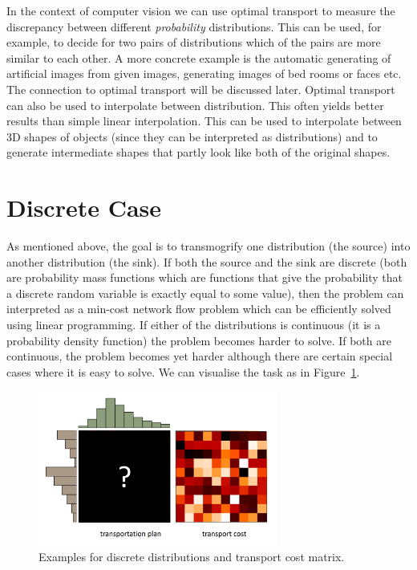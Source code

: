 In the context of computer vision we can use optimal transport to measure the
discrepancy between different \emph{probability} distributions. This can be
used, for example, to decide for two pairs of distributions which of the pairs
are more similar to each other. A more concrete example is the automatic
generating of artificial images from given images, \eg generating images of bed
rooms or faces etc. The connection to optimal transport will be discussed later.
Optimal transport can also be used to interpolate between distribution. This
often yields better results than simple linear interpolation. This can be used
to interpolate between 3D shapes of objects (since they can be interpreted as
distributions) and to generate intermediate shapes that partly look like both of
the original shapes.

\section{Discrete Case}
As mentioned above, the goal is to transmogrify one distribution (the source)
into another distribution (the sink). If both the source and the sink are
discrete (\ie both are probability mass functions which are functions that give
the probability that a discrete random variable is exactly equal to some value),
then the problem can interpreted as a min-cost network flow problem which can be
efficiently solved using linear programming. If either of the distributions is
continuous (\ie it is a probability density function) the problem becomes harder
to solve. If both are continuous, the problem becomes yet harder although there
are certain special cases where it is easy to solve. We can visualise the task
as in Figure~\ref{fig:transport}.

\begin{figure}[htpb]
  \centering \includegraphics[width=0.7\textwidth]{Figures/transport}
  \caption{Examples for discrete distributions and transport cost matrix.}%
  \label{fig:transport}
\end{figure}

